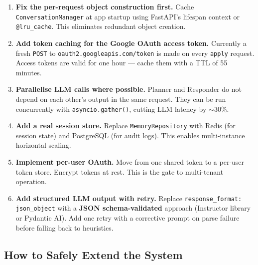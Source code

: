\documentclass[12pt, a4paper]{article}
\begin{document}
\begin{enumerate}
  \item \textbf{Fix the per-request object construction first.} Cache \texttt{ConversationManager} at app startup using FastAPI's lifespan context or \texttt{@lru\_cache}. This eliminates redundant object creation.

  \item \textbf{Add token caching for the Google OAuth access token.} Currently a fresh \texttt{POST} to \texttt{oauth2.googleapis.com/token} is made on every \texttt{apply} request. Access tokens are valid for one hour --- cache them with a TTL of 55 minutes.

  \item \textbf{Parallelise LLM calls where possible.} Planner and Responder do not depend on each other's output in the same request. They can be run concurrently with \texttt{asyncio.gather()}, cutting LLM latency by $\sim$30\%.

  \item \textbf{Add a real session store.} Replace \texttt{MemoryRepository} with Redis (for session state) and PostgreSQL (for audit logs). This enables multi-instance horizontal scaling.

  \item \textbf{Implement per-user OAuth.} Move from one shared token to a per-user token store. Encrypt tokens at rest. This is the gate to multi-tenant operation.

  \item \textbf{Add structured LLM output with retry.} Replace \texttt{response\_format: json\_object} with a \textbf{JSON schema-validated} approach (Instructor library or Pydantic AI). Add one retry with a corrective prompt on parse failure before falling back to heuristics.
\end{enumerate}

\subsection{How to Safely Extend the System}
\end{document}
